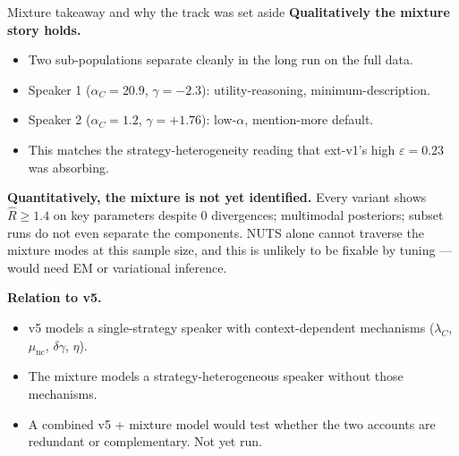 \documentclass[10pt,aspectratio=169]{beamer}
\newcommand{\main}[1]{\textcolor{CSP-main-dark}{\textbf{#1}}}
\begin{document}
\begin{frame}{Mixture takeaway and why the track was set aside}
\small
\main{Qualitatively the mixture story holds.}
\begin{itemize}\itemsep0.1em
  \item Two sub-populations separate cleanly in the long run on the full data.
  \item Speaker 1 ($\alpha_C = 20.9$, $\gamma = -2.3$): utility-reasoning, minimum-description.
  \item Speaker 2 ($\alpha_C = 1.2$, $\gamma = +1.76$): low-$\alpha$, mention-more default.
  \item This matches the strategy-heterogeneity reading that ext-v1's high $\varepsilon = 0.23$ was absorbing.
\end{itemize}

\vspace{0.5em}
\main{Quantitatively, the mixture is not yet identified.} Every variant shows $\hat R \geq 1.4$ on key parameters despite $0$ divergences; multimodal posteriors; subset runs do not even separate the components. NUTS alone cannot traverse the mixture modes at this sample size, and this is unlikely to be fixable by tuning --- would need EM or variational inference.

\vspace{0.5em}
\main{Relation to v5.}
\begin{itemize}\itemsep0.1em
  \item v5 models a single-strategy speaker with context-dependent mechanisms ($\lambda_C$, $\mu_\mathrm{nc}$, $\delta\gamma$, $\eta$).
  \item The mixture models a strategy-heterogeneous speaker without those mechanisms.
  \item A combined v5 + mixture model would test whether the two accounts are redundant or complementary. Not yet run.
\end{itemize}
\end{frame}
\end{document}

